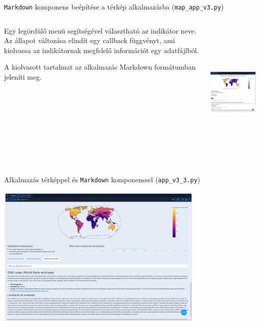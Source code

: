\documentclass[english, aspectratio=169]{beamer}
\begin{document}
\begin{frame}{\texttt{Markdown} komponens beépítése a térkép alkalmazásba (\texttt{map\_app\_v3.py})}
	\begin{columns}
		\begin{column}{.5\textwidth}
			Egy legördülő menü segítségével választható az indikátor neve. Az állapot változása elindít egy callback függvényt, ami kiolvassa az indikátornak megfelelő információt egy adatfájlból.\par\medskip
			A kiolvasott tartalmat az alkalmazás Markdown formátumban jeleníti meg.
		\end{column}
		\begin{column}{.5\textwidth}
			\begin{center}
				\includegraphics[width=7cm, height=7cm, keepaspectratio]{images/scatter_33.png}
			\end{center}
		\end{column}
	\end{columns}
\end{frame}

\begin{frame}{Alkalmazás térképpel és \texttt{Markdown} komponenssel (\texttt{app\_v3\_3.py})}
	\begin{center}
		\includegraphics[width=10cm, height=7cm, keepaspectratio]{images/scatter_32.png}
	\end{center}
\end{frame}
\end{document}
